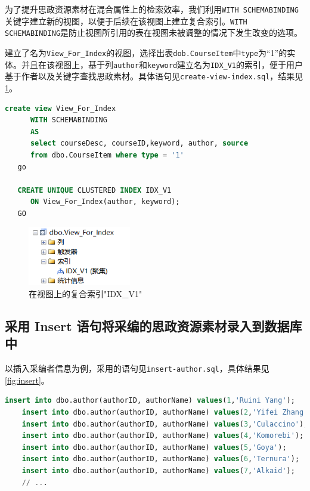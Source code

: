 \documentclass[11pt]{article}
\begin{document}
  为了提升思政资源素材在混合属性上的检索效率，我们利用\verb|WITH SCHEMABINDING|关键字建立新的视图，以便于后续在该视图上建立复合索引。\verb|WITH SCHEMABINDING|是防止视图所引用的表在视图未被调整的情况下发生改变的选项。

  建立了名为\verb|View_For_Index|的视图，选择出表\verb|dob.CourseItem|中\verb|type|为“1”的实体。并且在该视图上，基于列\verb|author|和\verb|keyword|建立名为\verb|IDX_V1|的索引，便于用户基于作者以及关键字查找思政素材。具体语句见\verb|create-view-index.sql|，结果见\ref{fig:IDX1}。

  \begin{file}
    \begin{lstlisting}[language=sql]
      create view View_For_Index
      WITH SCHEMABINDING
      AS
      select courseDesc, courseID,keyword, author, source 
      from dbo.CourseItem where type = '1'
   go
   
   CREATE UNIQUE CLUSTERED INDEX IDX_V1
      ON View_For_Index(author, keyword);
   GO
    \end{lstlisting}
  \end{file}

  \begin{figure}[h]
    \centering
    \includegraphics[width=0.4\textwidth]{IDX1.png}
    \caption{在视图上的复合索引"IDX\_V1"}
    \label{fig:IDX1}
  \end{figure}

  \subsection{采用 Insert 语句将采编的思政资源素材录入到数据库中}
  以插入采编者信息为例，采用的语句见\verb|insert-author.sql|，具体结果见\ref{fig:insert}。

  \begin{file}
    \begin{lstlisting}[language=sql]
    insert into dbo.author(authorID, authorName) values(1,'Ruini Yang');
    insert into dbo.author(authorID, authorName) values(2,'Yifei Zhang');
    insert into dbo.author(authorID, authorName) values(3,'Culaccino');
    insert into dbo.author(authorID, authorName) values(4,'Komorebi');
    insert into dbo.author(authorID, authorName) values(5,'Goya');
    insert into dbo.author(authorID, authorName) values(6,'Ternura');
    insert into dbo.author(authorID, authorName) values(7,'Alkaid');
    // ...
    \end{lstlisting}
  \end{file}
\end{document}
